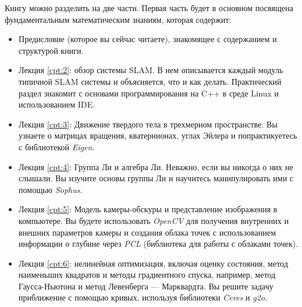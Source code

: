\begin{Russian}
    Книгу можно разделить на две части. Первая часть будет в основном посвящена фундаментальным математическим знаниям, которая содержит: 
    \begin{itemize}
        \item Предисловие (которое вы сейчас читаете), знакомящее с содержанием и структурой книги.
        \item Лекция \ref{cpt:2}: обзор системы SLAM. В нем описывается каждый модуль типичной SLAM системы и объясняется, что и как делать. Практический раздел знакомит с основами программирования на C++ в среде Linux и использованием IDE.
        \item Лекция \ref{cpt:3}: Движение твердого тела в трехмерном пространстве. Вы узнаете о матрицах вращения, кватернионах, углах Эйлера и попрактикуетесь с библиотекой \textit{Eigen}.
        \item Лекция \ref{cpt:4}: Группа Ли и алгебра Ли. Неважно, если вы никогда о них не слышали. Вы изучите основы группы Ли и научитесь манипулировать ими с помощью \textit{Sophus}.
        \item Лекция \ref{cpt:5}: Модель камеры-обскуры и представление изображения в компьютере. Вы будете использовать \textit{OpenCV} для получения внутренних и внешних параметров камеры и создания облака точек с использованием информации о глубине через \textit{PCL} (библиотека для работы с облаками точек).
        \item Лекция \ref{cpt:6}: нелинейная оптимизация, включая оценку состояния, метод наименьших квадратов и методы градиентного спуска, например, метод Гаусса-Ньютона и метод Левенберга — Марквардта. Вы решите задачу приближение с помощью кривых, используя библиотеки \textit{Ceres} и \textit{g2o}.
    \end{itemize}
\end{Russian}

